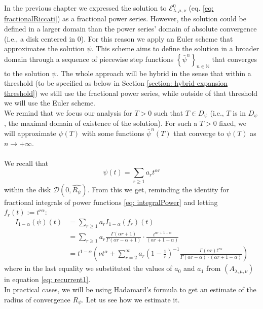 \documentclass[a4paper,italian,11pt]{book}
\theoremstyle{plain}
\theoremstyle{remark}
\theoremstyle{plain}
\begin{document}
In the previous chapter we expressed the solution to $\mathcal{E}^0_{\lambda, \mu, \nu}$ (eq. \eqref{eq: fractionalRiccati}) as a fractional power series. 
However, the solution could be defined in a larger domain than the power series' domain of absolute convergence (i.e., a disk centered in $0$). 
For this reason we apply an Euler scheme that approximates the solution $\psi$. 
This scheme aims to define the solution in a broader domain through a sequence of piecewise step functions $\left\{ \bar{\psi}^n \right\}_{n \in \mathbb{N}}$ that converges to the solution $\psi$. 
The whole approach will be hybrid in the sense that within a threshold (to be specified as below in Section \ref{section: hybrid expansion threshold}) we still use the fractional power series, while outside of that threshold we will use the Euler scheme.
\\

We remind that we focus our analysis for $T>0$ such that $T\in D_\psi$ (i.e., $T$ is in $D_\psi$, the maximal domain of existence of the solution).
For such a $T>0$ fixed, we will approximate $\psi(T)$ with some functions $\bar{\psi}^n(T)$ that converge to $\psi(T)$ as $n\to + \infty$. 
\\
\\
We recall that
$$ \psi(t)= \sum_{r\ge 1} a_r t^{\alpha r} $$
within the disk $\mathcal{D}(0,\widehat{R_\psi})$. 
From this we get, reminding the identity for fractional integrals of power functions \eqref{eq: integralPower} and letting $f_r(t) := t^{r\alpha}$:
\begin{equation}\label{eq: 27inthepaper}
\begin{aligned} 
    I_{1-\alpha}(\psi)(t) &= \sum_{r\ge 1} a_r I_{1-\alpha}(f_r)(t)
    \\
    &= \sum_{r\ge 1} a_r \frac{\Gamma(\alpha r + 1)}{\Gamma(\alpha r - \alpha + 1)}\cdot \frac{t^{\alpha r + 1 - \alpha}}{(\alpha r + 1 - \alpha)} 
    \\
    &= t^{1-\alpha} \left( \nu t^\alpha  +\sum_{r=2}^\infty a_r \left(1-\frac{1}{r}\right)^{-1} \frac{\Gamma(\alpha r) t^{r\alpha}}{ \Gamma(\alpha r - \alpha) \cdot (\alpha r + 1 - \alpha)}  \right)
\end{aligned}
\end{equation}
\noindent
where in the last equality we substituted the values of $a_0$ and $a_1$ from $(A_{\lambda,\mu,\nu})$ in equation \eqref{eq: recurrent1}.
\\

In practical cases, we will be using Hadamard's formula to get an estimate of the radius of convergence $R_\psi$. Let us see how we estimate it.
\end{document}
